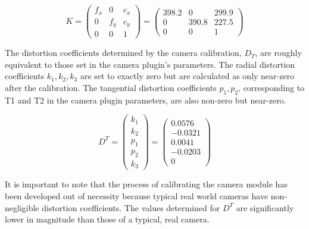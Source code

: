 \begin{equation}
    K=
    \begin{pmatrix}
        f_x & 0 & c_x\\
        0 & f_y & c_y\\
        0 & 0 & 1
    \end{pmatrix}
    =
    \begin{pmatrix}
        398.2 & 0 & 299.9\\
        0 & 390.8 & 227.5\\
        0 & 0 & 1
    \end{pmatrix}
    \label{equation:camera_intrinsic_matrix}
\end{equation}

The distortion coefficients determined by the camera calibration, $D_T$, are roughly equivalent to those set in the camera plugin's parameters. The radial distortion coefficients $k_1, k_2, k_3$ are set to exactly zero but are calculated as only near-zero after the calibration. The tangential distortion coefficients $p_1, p_2$, corresponding to T1 and T2 in the camera plugin parameters, are also non-zero but near-zero.

\begin{equation}
    D^T=
    \begin{pmatrix}
        k_1\\k_2\\p_1\\p_2\\k_3
    \end{pmatrix}
    =
    \begin{pmatrix}
        0.0576\\-0.0321\\0.0041\\-0.0203\\0
    \end{pmatrix}
    \label{equation:distortion_coefficients}
\end{equation}

It is important to note that the process of calibrating the camera module has been developed out of necessity because typical real world cameras have non-negligible distortion coefficients. The values determined for $D^T$ are significantly lower in magnitude than those of a typical, real camera. 



